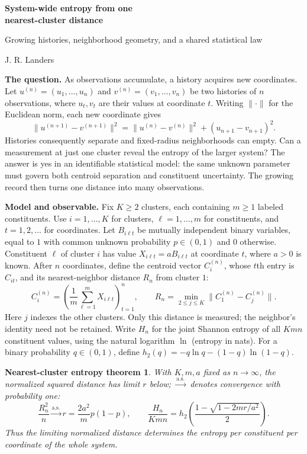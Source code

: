 \documentclass[11pt,letterpaper]{article}
\newcommand{\hbin}{h_2}
\newtheorem*{theorem}{Nearest-cluster entropy theorem}
\begin{document}
\begin{center}
{\Large\bfseries System-wide entropy from one\\[2pt] nearest-cluster distance}\par
\vspace{3pt}
{\small Growing histories, neighborhood geometry, and a shared statistical law}
\par\vspace{3pt}
{\small J. R. Landers}
\end{center}
\vspace{-5pt}

\textbf{The question.}
As observations accumulate, a history acquires new coordinates. Let
$u^{(n)}=(u_1,\ldots,u_n)$ and $v^{(n)}=(v_1,\ldots,v_n)$ be two histories
of $n$ observations, where $u_t,v_t$ are their values at coordinate $t$.
Writing $\|\cdot\|$ for the Euclidean norm, each new coordinate gives
\[
 \|u^{(n+1)}-v^{(n+1)}\|^2
 =\|u^{(n)}-v^{(n)}\|^2+(u_{n+1}-v_{n+1})^2.
\]
Histories consequently separate and fixed-radius neighborhoods can empty.
Can a measurement at just one cluster reveal the entropy of the larger system?
The answer is yes in an identifiable statistical model: the same unknown
parameter must govern both centroid separation and constituent uncertainty.
The growing record then turns one distance into many observations.

\textbf{Model and observable.}
Fix $K\geq2$ clusters, each containing $m\geq1$ labeled constituents.
Use $i=1,\ldots,K$ for clusters, $\ell=1,\ldots,m$ for constituents,
and $t=1,2,\ldots$ for coordinates. Let $B_{i\ell t}$ be mutually independent
binary variables, equal to $1$ with common unknown probability $p\in(0,1)$
and $0$ otherwise. Constituent $\ell$ of cluster $i$ has value
$X_{i\ell t}=aB_{i\ell t}$ at coordinate $t$, where $a>0$ is known.
After $n$ coordinates, define the centroid vector $C_i^{(n)}$, whose
$t$th entry is $C_{it}$, and its nearest-neighbor distance $R_n$ from cluster $1$:
\[
 C_i^{(n)}=\left(\frac1m\sum_{\ell=1}^m X_{i\ell t}\right)_{t=1}^n,
 \qquad R_n=\min_{2\leq j\leq K}\|C_1^{(n)}-C_j^{(n)}\|.
\]
Here $j$ indexes the other clusters. Only this distance is measured;
the neighbor's identity need not be retained. Write $H_n$ for the joint
Shannon entropy of all $Kmn$ constituent values, using the natural logarithm
$\ln$ (entropy in nats). For a binary probability $q\in(0,1)$, define
$\hbin(q)=-q\ln q-(1-q)\ln(1-q)$.

\begin{theorem}
With $K,m,a$ fixed as $n\to\infty$, the normalized squared distance has
limit $r$ below; $\xrightarrow{\mathrm{a.s.}}$ denotes convergence with probability one:
\begin{equation}
 \frac{R_n^2}{n}\xrightarrow{\mathrm{a.s.}}r=\frac{2a^2}{m}p(1-p),
 \qquad
 \frac{H_n}{Kmn}
 =\hbin\!\left(\frac{1-\sqrt{1-2mr/a^2}}{2}\right).
 \label{eq:main}
\end{equation}
Thus the limiting normalized distance determines the entropy per constituent
per coordinate of the whole system.
\end{theorem}
\end{document}

